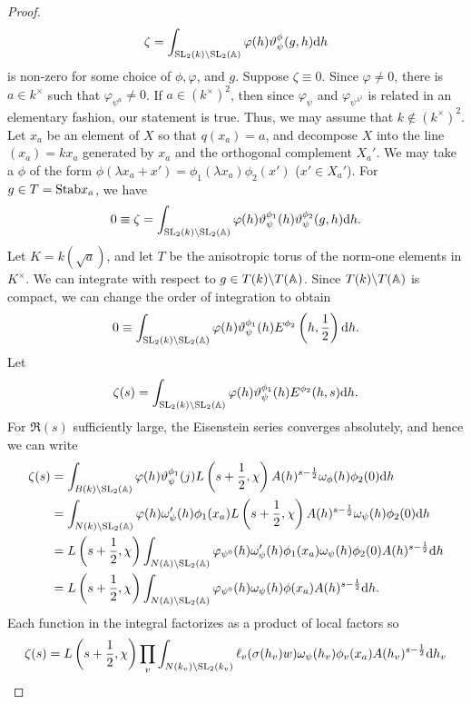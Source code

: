 \begin{proof}
\[
\zeta = \int_{\mathrm{SL}_2(k) \backslash \mathrm{SL}_2(\mathbb{A})} \varphi(h) \vartheta_\psi^\phi(g, h) \mathrm{d} h
\]
is non-zero for some choice of $\phi, \varphi$, and $g$.
Suppose $\zeta \equiv 0$.
Since $\varphi \neq 0$, there is $a \in k^\times$ such that $\varphi_{\psi^a} \neq 0$.
If $a \in (k^\times)^2$, then since $\varphi_{\psi}$ and $\varphi_{\psi^{\lambda^2}}$ is related in an elementary fashion, our statement is true.
Thus, we may assume that $k \not\in (k^\times)^2$.
Let $x_a$ be an element of $X$ so that $q(x_a) = a$, and decompose $X$ into the line $(x_a) = kx_a$ generated by $x_a$ and the orthogonal complement $X_a'$.
We may take a $\phi$ of the form $\phi(\lambda x_a + x') = \phi_1(\lambda x_a) \phi_2(x')$ ($x' \in X_a'$).
For $g \in T = \mathrm{Stab} x_a$, we have
\[
0 \equiv \zeta = \int_{\mathrm{SL}_2(k) \backslash \mathrm{SL}_2(\mathbb{A})} \varphi(h) \vartheta_\psi^{\phi_1}(h) \vartheta_{\psi}^{\phi_2}(g, h) \mathrm{d} h.
\]
Let $K = k(\sqrt{a})$, and let $T$ be the anisotropic torus of the norm-one elements in $K^\times$.
We can integrate with respect to $g\in T(k) \backslash T(\mathbb{A})$.
Since $T(k) \backslash T(\mathbb{A})$ is compact, we can change the order of integration to obtain
\[
0 \equiv \int_{\mathrm{SL}_2(k) \backslash \mathrm{SL}_2(\mathbb{A})} \varphi(h) \vartheta_\psi^{\phi_1}(h) E^{\phi_2}\left(h, \frac{1}{2}\right) \mathrm{d} h.
\]
Let
\[
\zeta(s) = \int_{\mathrm{SL}_2(k) \backslash \mathrm{SL}_2(\mathbb{A})} \varphi(h) \vartheta_\psi^{\phi_1}(h) E^{\phi_2}(h, s) \mathrm{d} h.
\]
For $\Re(s)$ sufficiently large, the Eisenstein series converges absolutely, and hence we can write
\begin{align*}
    \zeta(s) &= \int_{B(k) \backslash \mathrm{SL}_2(\mathbb{A})} \varphi(h) \vartheta_\psi^{\phi_1}(j) L\left(s + \frac{1}{2}, \chi\right) A(h)^{s - \frac{1}{2}} \omega_\phi(h) \phi_2(0) \mathrm{d} h \\
    &= \int_{N(k) \backslash \mathrm{SL}_2(\mathbb{A})} \varphi(h) \omega_\psi'(h) \phi_1(x_a) L\left(s + \frac{1}{2}, \chi\right)A(h)^{s - \frac{1}{2}} \omega_\psi(h) \phi_2(0) \mathrm{d} h \\
    &= L\left(s + \frac{1}{2}, \chi\right) \int_{N(\mathbb{A}) \backslash \mathrm{SL}_2(\mathbb{A})}\varphi_{\psi^{0}}(h) \omega_\psi'(h)\phi_1(x_a) \omega_\psi(h) \phi_2(0) A(h)^{s- \frac{1}{2}} \mathrm{d} h \\
    &= L \left(s + \frac{1}{2}, \chi\right) \int_{N(\mathbb{A}) \backslash \mathrm{SL}_2(\mathbb{A})} \varphi_{\psi^{0}}(h) \omega_\psi(h) \phi(x_a) A(h)^{s - \frac{1}{2}} \mathrm{d} h.
\end{align*}
Each function in the integral factorizes as a product of local factors so
\[
\zeta(s) = L\left(s + \frac{1}{2}, \chi\right) \prod_v \int_{N(k_v) \backslash \mathrm{SL}_2(k_v)} \ell_v(\sigma(h_v) w) \omega_\psi(h_v) \phi_v(x_a) A(h_v)^{s - \frac{1}{2}} \mathrm{d} h_v
\]
\end{proof}
